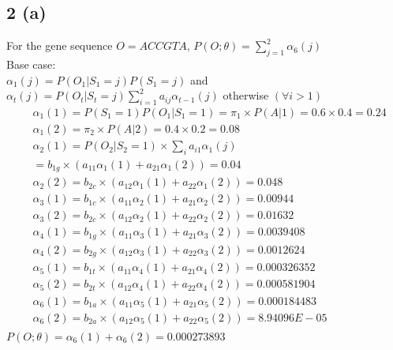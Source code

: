 \documentclass[10pt,letterpaper]{article}
\begin{document}
\subsection{2 (a)}  
For the gene sequence $O=ACCGTA$, $P(O;\theta) = \sum_{j=1}^2 \alpha_6(j)$\\
Base case: \\
$\alpha_1(j) = P(O_1|S_1=j)P(S_1=j)$ and \\
$ \alpha_t(j) = P(O_t|S_t=j)\sum_{i=1}^2a_{ij}\alpha_{t-1}(j) $  otherwise $(\forall i> 1)$\\
\begin{align*}
&\alpha_1(1) =P(S_1=1)P(O_1|S_1=1) = \pi_1 \times P(A|1) = 0.6 \times 0.4 = 0.24\\
&\alpha_1(2) = \pi_2 \times P(A|2) = 0.4 \times 0.2 = 0.08\\
&\alpha_2(1) = P(O_2|S_2=1) \times \sum_{i}a_{i1} \alpha_1(j) \\
&       = b_{1g} \times (a_{11}\alpha_1(1) + a_{21}\alpha_1(2)) =0.04\\
&\alpha_2(2) = b_{2c} \times (a_{12}\alpha_1(1) + a_{22}\alpha_1(2)) = 0.048\\
&\alpha_3(1) = b_{1c} \times (a_{11}\alpha_2(1) + a_{21}\alpha_2(2)) = 0.00944\\
&\alpha_3(2) = b_{2c} \times (a_{12}\alpha_2(1) + a_{22}\alpha_2(2)) = 0.01632\\
&\alpha_4(1) = b_{1g} \times (a_{11}\alpha_3(1) + a_{21}\alpha_3(2)) = 0.0039408\\
&\alpha_4(2) = b_{2g} \times (a_{12}\alpha_3(1) + a_{22}\alpha_3(2)) = 0.0012624\\
&\alpha_5(1) = b_{1t} \times (a_{11}\alpha_4(1) + a_{21}\alpha_4(2)) = 0.000326352\\
&\alpha_5(2) = b_{2t} \times (a_{12}\alpha_4(1) + a_{22}\alpha_4(2)) = 0.000581904\\
&\alpha_6(1) = b_{1a} \times (a_{11}\alpha_5(1) + a_{21}\alpha_5(2)) = 0.000184483\\
&\alpha_6(2) = b_{2a} \times (a_{12}\alpha_5(1) + a_{22}\alpha_5(2)) = 8.94096E-05\\		
\end{align*}
$P(O; \theta) = \alpha_6(1) + \alpha_6(2) = 0.000273893$ \\
\end{document}
